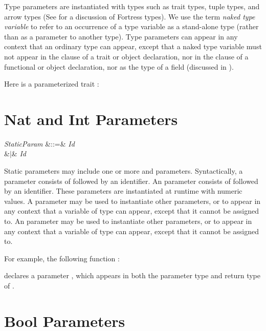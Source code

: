Type parameters are instantiated with types such as trait types, tuple types,
and arrow types (See  for a discussion of Fortress
types).  We use the term \emph{naked type variable} to refer to an
occurrence of a type variable as a stand-alone type (rather than as
a parameter to another type).  Type parameters can appear in any context
that an ordinary type can appear, except that a naked type variable must not
appear in the  clause of a trait or object declaration,
nor in the  clause of a functional or object declaration,
nor as the type of a  field (discussed in ).


Here is a parameterized trait :



\section{Nat and Int Parameters}

\begin{Grammar}
\emph{StaticParam} &::=&  \emph{Id} \\
&$|$&  \emph{Id} \\
\end{Grammar}

Static parameters may include one or more
 and  parameters.
Syntactically, a  parameter consists of
 followed by an identifier.
An  parameter consists of
 followed by an identifier.
These parameters are instantiated at runtime with numeric values.
A  parameter may be used to instantiate other
 parameters, or to appear in any context that a
variable of type  can appear,
except that it cannot be assigned to.
An  parameter may be used to instantiate other
 parameters, or to appear in any context that a
variable of type  can appear,
except that it cannot be assigned to.



For example, the following function :

declares a  parameter , which appears in both the parameter
type and return type of .



\section{Bool Parameters}

